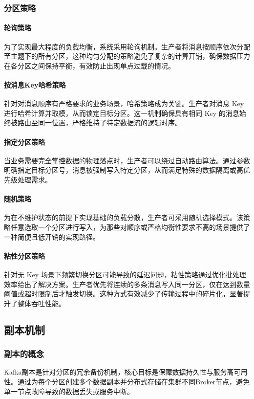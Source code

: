 		\subsubsection{分区策略} \paragraph{轮询策略} 为了实现最大程度的负载均衡，系统采用轮询机制。生产者将消息按顺序依次分配至主题下的所有分区，这种均匀分配的策略避免了复杂的计算开销，确保数据压力在各分区之间保持平衡，有效防止出现单点过载的情况。 \paragraph{按消息Key哈希策略} 针对对消息顺序有严格要求的业务场景，哈希策略成为关键。生产者对消息 Key 进行哈希计算并取模，从而锁定目标分区。这一机制确保具有相同 Key 的消息始终被路由至同一位置，严格维持了特定数据流的逻辑时序。 \paragraph{指定分区策略} 当业务需要完全掌控数据的物理落点时，生产者可以绕过自动路由算法。通过参数明确指定目标分区号，消息被强制写入特定分区，从而满足特殊的数据隔离或高优先级处理需求。 \paragraph{随机策略} 为在不维护状态的前提下实现基础的负载分散，生产者可采用随机选择模式。该策略任意选取一个分区进行写入，为那些对顺序或严格均衡性要求不高的场景提供了一种简便且低开销的实现路径。 \paragraph{粘性分区策略} 针对无 Key 场景下频繁切换分区可能导致的延迟问题，粘性策略通过优化批处理效率给出了解决方案。生产者优先将连续的多条消息写入同一分区，仅在达到数量阈值或超时限制后才触发切换。这种方式有效减少了传输过程中的碎片化，显著提升了整体吞吐性能。
	\subsection{副本机制}
		\subsubsection{副本的概念}
		Kafka副本是针对分区的冗余备份机制，核心目标是保障数据持久性与服务高可用性。通过为每个分区创建多个数据副本并分布式存储在集群不同Broker节点，避免单一节点故障导致的数据丢失或服务中断\cite{liu2025bigdatadrivenfrauddetection}。
